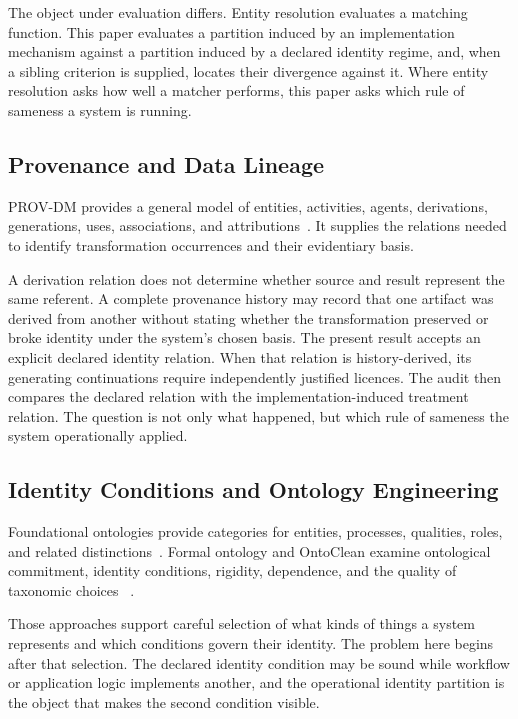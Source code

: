 \documentclass[11pt]{article}
\theoremstyle{plain}
\theoremstyle{definition}
\theoremstyle{remark}
\begin{document}
The object under evaluation differs.
Entity resolution evaluates a matching function.
This paper evaluates a partition induced by an implementation mechanism
against a partition induced by a declared identity regime,
and, when a sibling criterion is supplied, locates their divergence against it.
Where entity resolution asks how well a matcher performs,
this paper asks which rule of sameness a system is running.

\subsection{Provenance and Data Lineage}

PROV-DM provides a general model of entities,
activities, agents, derivations, generations, uses, associations,
and attributions~\citep{provdm2013}.
It supplies the relations needed to identify transformation occurrences and their evidentiary basis.

A derivation relation does not determine
whether source and result represent the same referent.
A complete provenance history may record
that one artifact was derived from another
without stating whether the transformation preserved
or broke identity under the system's chosen basis.
The present result accepts an explicit declared identity relation.
When that relation is history-derived, its generating
continuations require independently justified licences.
The audit then compares the declared relation with
the implementation-induced treatment relation.
The question is not only what happened,
but which rule of sameness the system operationally applied.

\subsection{Identity Conditions and Ontology Engineering}

Foundational ontologies provide categories
for entities, processes, qualities, roles, and related distinctions~\citep{arp2015building,gangemi2002dolce,masolo2003wonderweb}.
Formal ontology and OntoClean examine ontological commitment,
identity conditions, rigidity, dependence, and the quality of taxonomic choices
~\citep{guarino1998formalontology,guarino1999roles,guarinowelty2002,guizzardi2005}.

Those approaches support careful selection of what kinds of things a system represents
and which conditions govern their identity.
The problem here begins after that selection.
The declared identity condition may be sound while workflow or application logic implements another,
and the operational identity partition is the object that makes the second condition visible.
\end{document}
